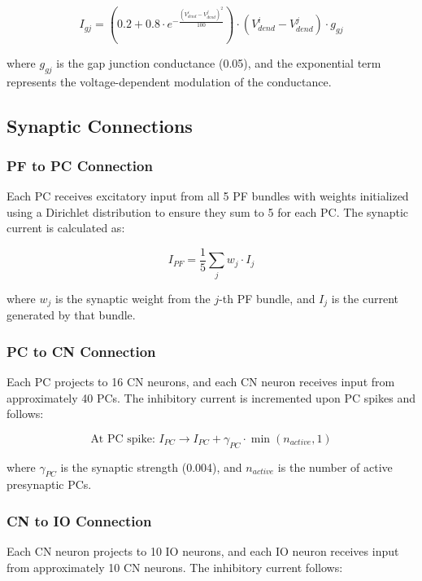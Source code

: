 \begin{equation}
I_{gj} = (0.2 + 0.8 \cdot e^{-\frac{(V_{dend}^i - V_{dend}^j)^2}{100}}) \cdot (V_{dend}^i - V_{dend}^j) \cdot g_{gj}
\end{equation}

where $g_{gj}$ is the gap junction conductance (0.05), and the exponential term represents the voltage-dependent modulation of the conductance.

\subsection{Synaptic Connections}

\subsubsection{PF to PC Connection}

Each PC receives excitatory input from all 5 PF bundles with weights initialized using a Dirichlet distribution to ensure they sum to 5 for each PC. The synaptic current is calculated as:

\begin{equation}
I_{PF} = \frac{1}{5} \sum_{j} w_{j} \cdot I_{j}
\end{equation}

where $w_j$ is the synaptic weight from the $j$-th PF bundle, and $I_j$ is the current generated by that bundle.

\subsubsection{PC to CN Connection}

Each PC projects to 16 CN neurons, and each CN neuron receives input from approximately 40 PCs. The inhibitory current is incremented upon PC spikes and follows:

\begin{equation}
\text{At PC spike: } I_{PC} \rightarrow I_{PC} + \gamma_{PC} \cdot \min(n_{active}, 1)
\end{equation}

where $\gamma_{PC}$ is the synaptic strength (0.004), and $n_{active}$ is the number of active presynaptic PCs.

\subsubsection{CN to IO Connection}

Each CN neuron projects to 10 IO neurons, and each IO neuron receives input from approximately 10 CN neurons. The inhibitory current follows:

